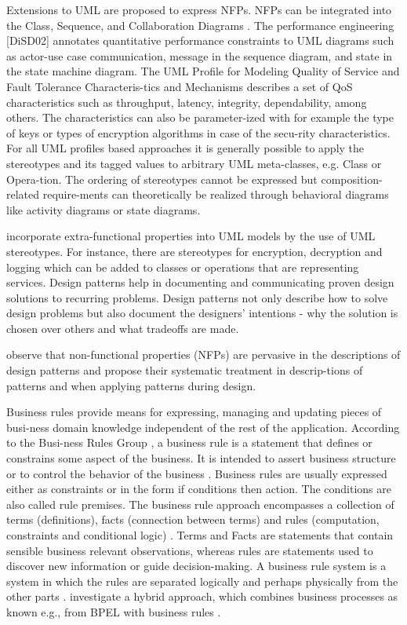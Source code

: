 Extensions to UML are proposed to express NFPs. NFPs can be integrated into the Class, Sequence, and Collaboration Diagrams \cite{CyPr04}. The performance engineering [DiSD02] annotates quantitative performance constraints to UML diagrams such as actor-use case communication, message in the sequence diagram, and state in the state machine diagram. The UML Profile for Modeling Quality of Service and Fault Tolerance Characteris-tics and Mechanisms \cite{Omg04} describes a set of QoS characteristics such as throughput, latency, integrity, dependability, among others. The characteristics can also be parameter-ized with for example the type of keys or types of encryption algorithms in case of the secu-rity characteristics. For all UML profiles based approaches it is generally possible to apply the stereotypes and its tagged values to arbitrary UML meta-classes, e.g. Class or Opera-tion. The ordering of stereotypes cannot be expressed but composition- related require-ments can theoretically be realized through behavioral diagrams like activity diagrams or state diagrams.

\cite{OrHe07} incorporate extra-functional properties into UML models by the use of UML stereotypes. For instance, there are stereotypes for encryption, decryption and logging which can be added to classes or operations that are representing services.
Design patterns help in documenting and communicating proven design solutions to recurring problems. Design patterns not only describe how to solve design problems but also document the designers’ intentions - why the solution is chosen over others and what tradeoffs are made. 

\cite{GrYu01} observe that non-functional properties  (NFPs) are pervasive in the descriptions of design patterns and propose their systematic treatment in descrip-tions of patterns and when applying patterns during design. 

Business rules provide means for expressing, managing and updating pieces of busi-ness domain knowledge independent of the rest of the application. According to the Busi-ness Rules Group \cite{Hay00}, a business rule is a statement that defines or constrains some aspect of the business. It is intended to assert business structure or to control the behavior of the business \cite{Hay00}. Business rules are usually expressed either as constraints or in the form if conditions then action. The conditions are also called rule premises. The business rule approach encompasses a collection of terms (definitions), facts (connection between terms) and rules (computation, constraints and conditional logic) \cite{Hall01}. Terms and Facts are statements that contain sensible business relevant observations, whereas rules are statements used to discover new information or guide decision-making. A business rule system is a system in which the rules are separated logically and perhaps physically from the other parts \cite{ChMe04}. \cite{ChMe04} investigate a hybrid approach, which combines business processes as known e.g., from BPEL with business rules \cite{Hay00}.

